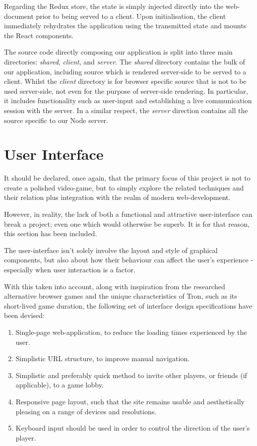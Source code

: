 \documentclass{standalone}
\begin{document}
			Regarding the Redux store, the state is simply injected directly into the web-document prior to being served to a client. Upon initialisation, the client immediately rehydrates the application using the transmitted state and mounts the React components.

			The source code directly composing our application is split into three main directories: \emph{shared}, \emph{client}, and \emph{server}. The \emph{shared} directory contains the bulk of our application, including source which is rendered server-side to be served to a client. Whilst the \emph{client} directory is for browser specific source that is not to be used server-side, not even for the purpose of server-side rendering. In particular, it includes functionality such as user-input and establishing a live communication session with the server. In a similar respect, the \emph{server} direction contains all the source specific to our Node server.

	\section{User Interface}
		It should be declared, once again, that the primary focus of this project is not to create a polished video-game, but to simply explore the related techniques and their relation plus integration with the realm of modern web-development.

		However, in reality, the lack of both a functional and attractive user-interface can break a project; even one which would otherwise be superb. It is for that reason, this section has been included.

		The user-interface isn't solely involve the layout and style of graphical components, but also about how their behaviour can affect the user's experience - especially when user interaction is a factor.

		With this taken into account, along with inspiration from the researched alternative browser games and the unique characteristics of Tron, such as its short-lived game duration, the following set of interface design specifications have been devised:

		\begin{formal}
			\begin{enumerate}
				\item Single-page web-application, to reduce the loading times experienced by the user.
				\item Simplistic URL structure, to improve manual navigation.
				\item Simplistic and preferably quick method to invite other players, or friends (if applicable), to a game lobby.
				\item Responsive page layout, such that the site remains usable and aesthetically pleasing on a range of devices and resolutions.
				\item Keyboard input should be used in order to control the direction of the user's player.
			\end{enumerate}
		\end{formal}
\end{document}
